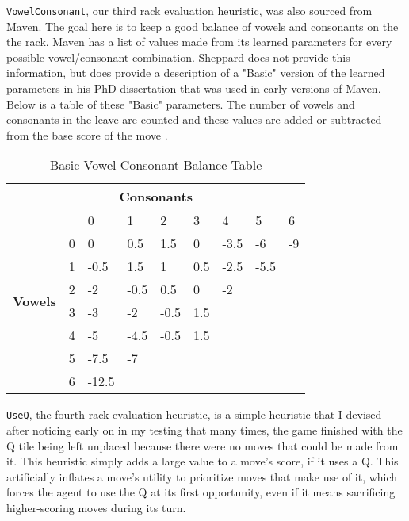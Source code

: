 \documentclass[letterpaper]{article}
\begin{document}
\texttt{VowelConsonant}, our third rack evaluation heuristic, was also sourced from Maven. The goal here is to keep a good balance of vowels and consonants on the the rack. Maven has a list of values made from its learned parameters for every possible vowel/consonant combination. Sheppard does not provide this information, but does provide a description of a "Basic" version of the learned parameters in his PhD dissertation that was used in early versions of Maven. Below is a table of these "Basic" parameters. The number of vowels and consonants in the leave are counted and these values are added or subtracted from the base score of the move \cite{2sheppard2002}.


\begin{table}[h]
\caption {Basic Vowel-Consonant Balance Table}
\begin{tabular}{|c|l|l|l|l|l|l|l|l|}
\hline
\multicolumn{9}{|c|}{\textbf{Consonants}}                                           \\ \hline
\multirow{8}{*}{\textbf{Vowels}} &   & 0     & 1    & 2    & 3   & 4    & 5    & 6  \\ \cline{2-9} 
                        & 0 & 0     & 0.5  & 1.5  & 0   & -3.5 & -6   & -9 \\ \cline{2-9} 
                        & 1 & -0.5  & 1.5  & 1    & 0.5 & -2.5 & -5.5 &    \\ \cline{2-9} 
                        & 2 & -2    & -0.5 & 0.5  & 0   & -2   &      &    \\ \cline{2-9} 
                        & 3 & -3    & -2   & -0.5 & 1.5 &      &      &    \\ \cline{2-9} 
                        & 4 & -5    & -4.5 & -0.5 & 1.5 &      &      &    \\ \cline{2-9} 
                        & 5 & -7.5  & -7   &      &     &      &      &    \\ \cline{2-9} 
                        & 6 & -12.5 &      &      &     &      &      &    \\ \hline
\end{tabular}
\end{table}

\texttt{UseQ}, the fourth rack evaluation heuristic, is a simple heuristic that I devised after noticing early on in my testing that many times, the game finished with the Q tile being left unplaced because there were no moves that could be made from it. This heuristic simply adds a large value to a move's score, if it uses a Q. This artificially inflates a move's utility to prioritize moves that make use of it, which forces the agent to use the Q at its first opportunity, even if it means sacrificing higher-scoring moves during its turn.
\end{document}
